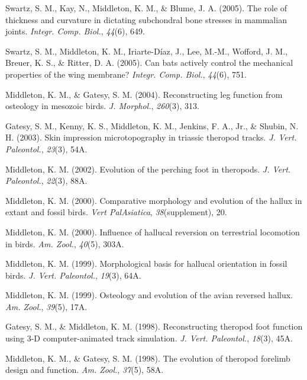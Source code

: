 \documentclass[11pt, a4paper]{awesome-cv}
\begin{document}
\leavevmode\hypertarget{ref-swartz_role_2005}{}%
Swartz, S. M., Kay, N., Middleton, K. M., \& Blume, J. A. (2005). The
role of thickness and curvature in dictating subchondral bone stresses
in mammalian joints. \emph{Integr. Comp. Biol.}, \emph{44}(6), 649.

\leavevmode\hypertarget{ref-swartz_can_2005}{}%
Swartz, S. M., Middleton, K. M., Iriarte-Díaz, J., Lee, M.-M., Wofford,
J. M., Breuer, K. S., \& Ritter, D. A. (2005). Can bats actively control
the mechanical properties of the wing membrane? \emph{Integr. Comp.
Biol.}, \emph{44}(6), 751.

\leavevmode\hypertarget{ref-middleton_reconstructing_2004}{}%
Middleton, K. M., \& Gatesy, S. M. (2004). Reconstructing leg function
from osteology in mesozoic birds. \emph{J. Morphol.}, \emph{260}(3),
313.

\leavevmode\hypertarget{ref-gatesy_skin_2003}{}%
Gatesy, S. M., Kenny, K. S., Middleton, K. M., Jenkins, F. A., Jr., \&
Shubin, N. H. (2003). Skin impression microtopography in triassic
theropod tracks. \emph{J. Vert. Paleontol.}, \emph{23}(3), 54A.

\leavevmode\hypertarget{ref-middleton_evolution_2002}{}%
Middleton, K. M. (2002). Evolution of the perching foot in theropods.
\emph{J. Vert. Paleontol.}, \emph{22}(3), 88A.

\leavevmode\hypertarget{ref-middleton_comparative_2000}{}%
Middleton, K. M. (2000). Comparative morphology and evolution of the
hallux in extant and fossil birds. \emph{Vert PalAsiatica},
\emph{38}(supplement), 20.

\leavevmode\hypertarget{ref-middleton_influence_2000}{}%
Middleton, K. M. (2000). Influence of hallucal reversion on terrestrial
locomotion in birds. \emph{Am. Zool.}, \emph{40}(5), 303A.

\leavevmode\hypertarget{ref-middleton_morphological_1999}{}%
Middleton, K. M. (1999). Morphological basis for hallucal orientation in
fossil birds. \emph{J. Vert. Paleontol.}, \emph{19}(3), 64A.

\leavevmode\hypertarget{ref-middleton_osteology_1999}{}%
Middleton, K. M. (1999). Osteology and evolution of the avian reversed
hallux. \emph{Am. Zool.}, \emph{39}(5), 17A.

\leavevmode\hypertarget{ref-gatesy_reconstructing_1998}{}%
Gatesy, S. M., \& Middleton, K. M. (1998). Reconstructing theropod foot
function using 3-D computer-animated track simulation. \emph{J. Vert.
Paleontol.}, \emph{18}(3), 45A.

\leavevmode\hypertarget{ref-middleton_evolution_1998}{}%
Middleton, K. M., \& Gatesy, S. M. (1998). The evolution of theropod
forelimb design and function. \emph{Am. Zool.}, \emph{37}(5), 58A.
\end{document}
